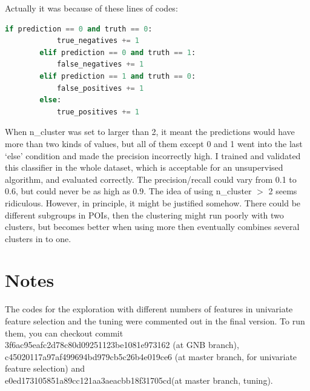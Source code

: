\documentclass[12pt]{article}
\begin{document}
Actually it was because of these lines of codes:
\begin{lstlisting}[language=Python,keywordstyle=\color{blue!70},commentstyle=\color{red!50!green!50!blue!50},frame=shadowbox, rulesepcolor=\color{red!20!green!20!blue!20}]
        if prediction == 0 and truth == 0:
            true_negatives += 1
        elif prediction == 0 and truth == 1:
            false_negatives += 1
        elif prediction == 1 and truth == 0:
            false_positives += 1
        else:
            true_positives += 1
\end{lstlisting}
When n\_cluster was set to larger than 2, it meant the predictions would have more than two kinds of values, but all of them except 0 and 1 went into the last `else' condition and made the precision incorrectly high. I trained and validated this classifier in the whole dataset, which is acceptable for an unsupervised algorithm, and evaluated correctly. The precision/recall could vary from 0.1 to 0.6, but could never be as high as 0.9. The idea of using n\_cluster $>$ 2 seems ridiculous. However, in principle, it might be justified somehow. There could be different subgroups in POIs, then the clustering might run poorly with two clusters, but becomes better when using more then eventually combines several clusters in to one.
\section{Notes}
The codes for the exploration with different numbers of features in univariate feature selection and the tuning were commented out in the final version. To run them, you can checkout commit\\
3f6ac95eafc2d78c80d09251123be1081e973162 (at GNB branch),\\
c45020117a97af499694bd979cb5c26b4e019ce6 (at master branch, for univariate feature selection)
and \\
e0ed173105851a89cc121aa3aeacbb18f31705cd(at master branch, tuning).
\end{document}
